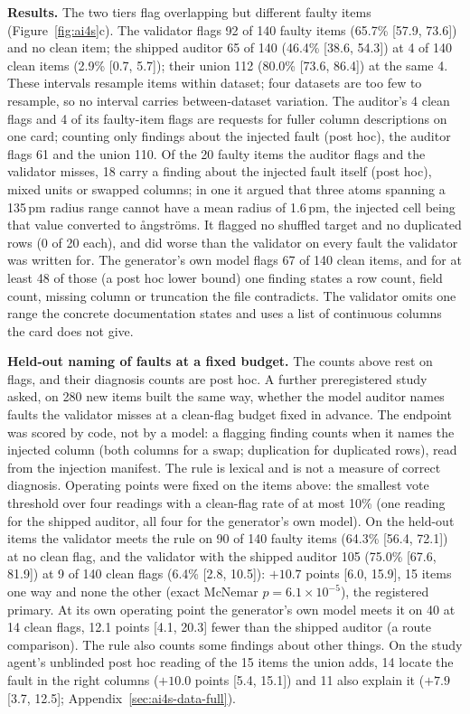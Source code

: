 \textbf{Results.} The two tiers flag overlapping but different faulty items (Figure~\ref{fig:ai4s}c). The validator flags
92 of 140 faulty items (65.7\% [57.9, 73.6]) and no clean item; the shipped auditor 65 of 140 (46.4\%
[38.6, 54.3]) at 4 of 140 clean items (2.9\% [0.7, 5.7]); their union 112 (80.0\% [73.6, 86.4]) at the
same 4. These intervals resample items within dataset; four datasets are too few to resample, so no
interval carries between-dataset variation. The auditor's 4 clean flags and 4 of its faulty-item flags
are requests for fuller column descriptions on one card; counting only findings about the injected
fault (post hoc), the auditor flags 61 and the union 110.
Of the 20 faulty items the auditor flags and the validator misses, 18 carry a finding about the
injected fault itself (post hoc), mixed units or swapped columns; in one it argued that three atoms
spanning a 135\,pm radius range cannot have a mean radius of 1.6\,pm, the injected cell being that value converted to {\aa}ngstr\"oms.
It flagged no shuffled target and no duplicated rows (0 of 20 each), and did worse than the
validator on every fault the validator was written for. The generator's own model flags 67 of 140
clean items, and for at least 48 of those (a post hoc lower bound) one finding states a row count, field count, missing
column or truncation the file contradicts. The validator omits one range the concrete documentation
states and uses a list of continuous columns the card does not give.

\textbf{Held-out naming of faults at a fixed budget.} The counts above rest on flags, and their
diagnosis counts are post hoc. A further preregistered study asked, on 280 new items built the same way, whether the model auditor names faults the validator misses at a clean-flag budget fixed in advance. The endpoint was scored by code, not by a model: a flagging finding counts when it names the injected column (both columns
for a swap; duplication for duplicated rows), read from the injection manifest. The rule is lexical and is not a measure of correct diagnosis. Operating points were fixed on the items above: the smallest vote threshold over four readings with a clean-flag rate of at most 10\% (one reading for the shipped auditor, all four for the generator's own model). On the held-out items the validator meets the rule on 90 of 140 faulty items
(64.3\% [56.4, 72.1]) at no clean flag, and the validator with the shipped auditor 105 (75.0\%
[67.6, 81.9]) at 9 of 140 clean flags (6.4\% [2.8, 10.5]): $+10.7$ points [6.0, 15.9], 15 items one
way and none the other (exact McNemar $p = 6.1\times10^{-5}$), the registered primary. At its own operating point the generator's own model meets it on 40 at 14 clean flags, 12.1 points [4.1, 20.3] fewer than the shipped auditor (a route comparison). The rule also counts some findings about other things. On the study agent's unblinded post hoc reading of the 15 items the union adds, 14 locate the fault in the right columns ($+10.0$ points [5.4, 15.1]) and 11 also explain it ($+7.9$ [3.7, 12.5]; Appendix~\ref{sec:ai4s-data-full}).
